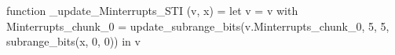 function _update_Minterrupts_STI (v, x) = let v = { v with Minterrupts_chunk_0 = update_subrange_bits(v.Minterrupts_chunk_0, 5, 5, subrange_bits(x, 0, 0)) } in
  v
